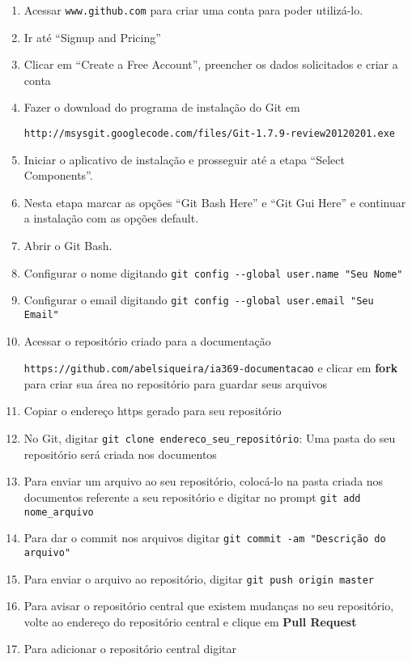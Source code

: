 \documentclass[letterpaper,11pt]{article}
\begin{document}
\begin{enumerate}
\item Acessar \verb+www.github.com+ para criar uma conta para poder utilizá-lo.
\item Ir até ``Signup and Pricing''
\item Clicar em ``Create a Free Account'', preencher os dados solicitados e criar a conta
\item Fazer o download do programa de instalação do Git em 

\verb+http://msysgit.googlecode.com/files/Git-1.7.9-review20120201.exe+
\item Iniciar o aplicativo de instalação e prosseguir até a etapa ``Select Components''.
\item Nesta etapa marcar as opções ``Git Bash Here'' e ``Git Gui Here'' e continuar a instalação
com as opções default.
\item Abrir o Git Bash.
\item Configurar o nome digitando \verb+git config --global user.name "Seu Nome"+
\item Configurar o email digitando \verb+git config --global user.email "Seu Email"+
\item Acessar o repositório criado para a documentação 

\verb+https://github.com/abelsiqueira/ia369-documentacao+ 
e clicar em {\bf fork} para criar sua área no repositório para guardar seus
arquivos
\item Copiar o endereço https gerado para seu repositório
\item No Git, digitar 
\verb+git clone endereco_seu_repositório+: Uma pasta do seu repositório será
criada nos documentos
\item Para enviar um arquivo ao seu repositório, colocá-lo na pasta criada nos documentos
referente a seu repositório e digitar no prompt 
\verb+git add nome_arquivo+
\item Para dar o commit nos arquivos digitar 
\verb+git commit -am "Descrição do arquivo"+
\item Para enviar o arquivo ao repositório, digitar 
\verb+git push origin master+
\item Para avisar o repositório central que existem mudanças no seu
repositório, volte ao endereço do repositório central e clique em
{\bf Pull Request}
\item Para adicionar o repositório central digitar 


\end{enumerate}
\end{document}
